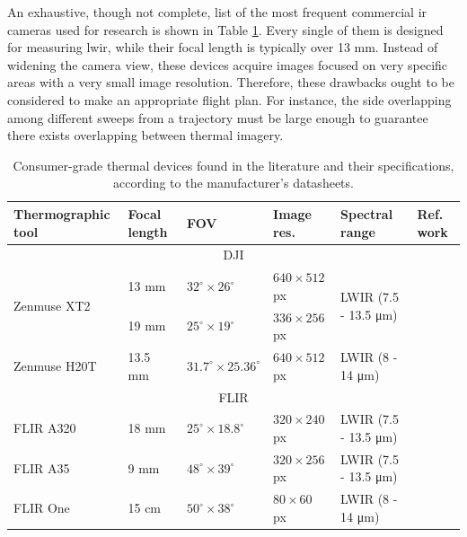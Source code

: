 An exhaustive, though not complete, list of the most frequent commercial \acrshort{ir} cameras used for research is shown in Table \ref{table:thermographic_devices}. Every single of them is designed for measuring \acrshort{lwir}, while their focal length is typically over 13 \si{\milli\meter}. Instead of widening the camera view, these devices acquire images focused on very specific areas with a very small image resolution. Therefore, these drawbacks ought to be considered to make an appropriate flight plan. For instance, the side overlapping among different sweeps from a trajectory must be large enough to guarantee there exists overlapping between thermal imagery. 

\renewcommand{\arraystretch}{1.2}
\begin{table}[htb]
    \small
    \caption{Consumer-grade thermal devices found in the literature and their specifications, according to the manufacturer's datasheets.}
    \label{table:thermographic_devices}
    \begin{tabular}{llllll}
        \toprule
        Thermographic tool & Focal length & FOV & Image res. & Spectral range & Ref. work \\
        \midrule
        \multicolumn{6}{c}{DJI}\\
        \multirow{2}{*}{Zenmuse XT2}    & 13 \si{\milli\meter}   & $32^{\circ} \times 26^{\circ}$  & $640 \times 512$ px  & \multirow{2}{*}{LWIR (7.5 - 13.5 \si{\micro\meter})}    & \multirow{2}{*}{\cite{lopez_optimized_2021, yuan_uav-based_2021, jo_dense_2021}}\\
        & 19 \si{\milli\meter}   & $25^{\circ} \times 19^{\circ}$  & $336 \times 256$ px  &   & \\
        Zenmuse H20T     & 13.5 \si{\milli\meter}   & $31.7^{\circ} \times 25.36^{\circ}$  & $640 \times 512$ px  & LWIR (8 - 14 \si{\micro\meter})    & \cite{paziewska_integration_2022, jiang_diurnal_2022}\\
        \cmidrule{1-6}
        \multicolumn{6}{c}{FLIR}\\
        FLIR A320     & 18 \si{\milli\meter}   & $25^{\circ} \times 18.8^{\circ}$  & $320 \times 240$ px  & LWIR (7.5 - 13.5 \si{\micro\meter})    & \cite{guilbert_fusion_2020}\\
        FLIR A35     & 9 \si{\milli\meter}   & $48^{\circ} \times 39^{\circ}$  & $320 \times 256$ px  & LWIR (7.5 - 13.5 \si{\micro\meter})    & \cite{comba_2d_2019}\\
        FLIR One     & 15 \si{\centi\meter}   & $50^{\circ} \times 38^{\circ}$  & $80 \times 60$ px  & LWIR (8 - 14 \si{\micro\meter})    & \cite{javadnejad_photogrammetric_2020}\\

\end{tabular}
\end{table}
